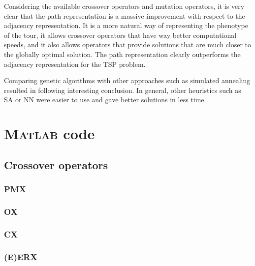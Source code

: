 ﻿\documentclass[a4paper,english,11pt,]{scrartcl}
\begin{document}
Considering the available crossover operators and mutation operators, it is very clear that the path representation is a massive improvement with respect to the adjacency representation. It is a more natural way of representing the phenotype of the tour, it allows crossover operators that have way better computational speeds, and it also allows operators that provide solutions that are much closer to the globally optimal solution. The path representation clearly outperforms the adjacency representation for the TSP problem. 

Comparing genetic algorithms with other approaches such as simulated annealing resulted in following interesting conclusion. In general, other heuristics such as SA or NN were easier to use and gave better solutions in less time.


\clearpage
\appendix
\section{\textsc{Matlab} code}
\label{sec:code}
\subsection{Crossover operators}
\label{appendix:crossover}
\subsubsection{PMX}



\subsubsection{OX}
 

\subsubsection{CX}
 

\subsubsection{(E)ERX}
 
 
 
\end{document}

